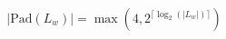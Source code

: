 \documentclass[preview,varwidth=88mm]{standalone}
\begin{document}
\begin{equation*}
|\text{Pad}(L_w)| = \max\left(4, 2^{\lceil \log_2 (|L_w|) \rceil}\right)
\end{equation*}
\end{document}
